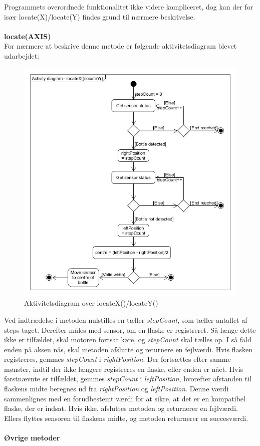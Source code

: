 Programmets overordnede funktionalitet ikke videre kompliceret, dog kan der for især locate(X)/locate(Y) findes grund til nærmere beskrivelse.
\\
\\
\textbf{locate(AXIS)} \\
For nærmere at beskrive denne metode er følgende aktivitetsdiagram blevet udarbejdet: \\

\begin{figure}[H]
	\centerline{\includegraphics[scale=0.5]{tex/Design/PSoC/AD_locate.jpg}}
	\caption{Aktivitetsdiagram over locateX()/locateY()}
	\label{AD_locate}
\end{figure}

Ved indtrædelse i metoden nulstilles en tæller \textit{stepCount}, som tæller antallet af steps taget. Derefter måles med sensor, om en flaske er registreret. Så længe dette ikke er tilfældet, skal motoren fortsat køre, og \textit{stepCount} skal tælles op. I så fald enden på aksen nås, skal metoden afslutte og returnere en fejlværdi. Hvis flasken registreres, gemmes \textit{stepCount} i \textit{rightPosition}. Der fortsættes efter samme mønster, indtil der ikke længere registreres en flaske, eller enden er nået. Hvis førstnævnte er tilfældet, gemmes \textit{stepCount} i \textit{leftPosition}, hvorefter afstanden til flaskens midte beregnes ud fra \textit{rightPosition} og \textit{leftPosition}. Denne værdi sammenlignes med en forudbestemt værdi for at sikre, at det er en kompatibel flaske, der er indsat. Hvis ikke, afsluttes metoden og returnerer en fejlværdi. Ellers flyttes sensoren til flaskens midte, og metoden returnerer en succesværdi.
\\
\\
\textbf{Øvrige metoder}

